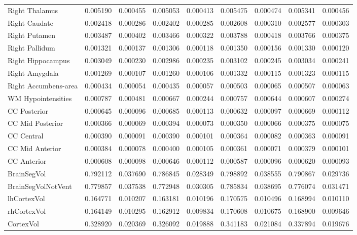 \documentclass[diagnostics,article,accept,pdftex,moreauthors]{Definitions/mdpi}
\begin{document}
\begin{table}[H]
\begin{tabular}{lcccccccc}
Right Thalamus & 0.005190 & 0.000455 & 0.005053 & 0.000413 & 0.005475 & 0.000474 & 0.005341 & 0.000456 \\
Right Caudate & 0.002418 & 0.000286 & 0.002402 & 0.000285 & 0.002608 & 0.000310 & 0.002577 & 0.000303 \\
Right Putamen & 0.003487 & 0.000402 & 0.003466 & 0.000322 & 0.003788 & 0.000418 & 0.003766 & 0.000375 \\
Right Pallidum & 0.001321 & 0.000137 & 0.001306 & 0.000118 & 0.001350 & 0.000156 & 0.001330 & 0.000120 \\
Right Hippocampus & 0.003049 & 0.000230 & 0.002986 & 0.000235 & 0.003102 & 0.000245 & 0.003034 & 0.000241 \\
Right Amygdala & 0.001269 & 0.000107 & 0.001260 & 0.000106 & 0.001332 & 0.000115 & 0.001323 & 0.000115 \\
Right Accumbens-area & 0.000434 & 0.000054 & 0.000435 & 0.000057 & 0.000503 & 0.000065 & 0.000507 & 0.000063 \\
WM Hypointensities & 0.000787 & 0.000481 & 0.000667 & 0.000244 & 0.000757 & 0.000644 & 0.000607 & 0.000274 \\
CC Posterior & 0.000645 & 0.000096 & 0.000685 & 0.000113 & 0.000632 & 0.000097 & 0.000669 & 0.000112 \\
CC Mid Posterior & 0.000366 & 0.000069 & 0.000394 & 0.000073 & 0.000350 & 0.000066 & 0.000375 & 0.000075 \\
CC Central & 0.000390 & 0.000091 & 0.000390 & 0.000101 & 0.000364 & 0.000082 & 0.000363 & 0.000091 \\
CC Mid Anterior & 0.000384 & 0.000078 & 0.000400 & 0.000105 & 0.000361 & 0.000071 & 0.000379 & 0.000101 \\
CC Anterior & 0.000608 & 0.000098 & 0.000646 & 0.000112 & 0.000587 & 0.000096 & 0.000620 & 0.000093 \\
BrainSegVol & 0.792112 & 0.037690 & 0.786845 & 0.028349 & 0.798892 & 0.038555 & 0.790867 & 0.029736 \\
BrainSegVolNotVent & 0.779857 & 0.037538 & 0.772948 & 0.030305 & 0.785834 & 0.038695 & 0.776074 & 0.031471 \\
lhCortexVol & 0.164771 & 0.010207 & 0.163181 & 0.010196 & 0.170575 & 0.010496 & 0.168994 & 0.010110 \\
rhCortexVol & 0.164149 & 0.010295 & 0.162912 & 0.009834 & 0.170608 & 0.010675 & 0.168900 & 0.009646 \\
CortexVol & 0.328920 & 0.020369 & 0.326092 & 0.019888 & 0.341183 & 0.021084 & 0.337894 & 0.019676 \\

\end{tabular}
\end{table}
\end{document}
